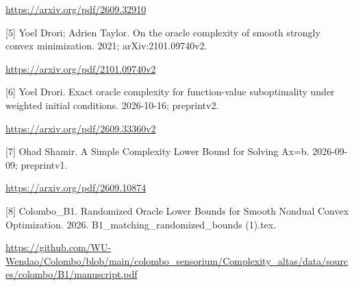 \documentclass[10pt,a4paper]{article}
\begin{document}
\url{https://arxiv.org/pdf/2609.32910}



[5] Yoel Drori; Adrien Taylor. On the oracle complexity of smooth strongly convex minimization. 2021; arXiv:2101.09740v2.



\url{https://arxiv.org/pdf/2101.09740v2}



[6] Yoel Drori. Exact oracle complexity for function-value suboptimality under weighted initial conditions. 2026-10-16; preprintv2.



\url{https://arxiv.org/pdf/2609.33360v2}



[7] Ohad Shamir. A Simple Complexity Lower Bound for Solving Ax=b. 2026-09-09; preprintv1.



\url{https://arxiv.org/pdf/2609.10874}



[8] Colombo\_B1. Randomized Oracle Lower Bounds for Smooth Nondual Convex Optimization. 2026. B1\_matching\_randomized\_bounds (1).tex.



\url{https://github.com/WU-Wendao/Colombo/blob/main/colombo_sensorium/Complexity_altas/data/sources/colombo/B1/manuscript.pdf}
\end{document}
